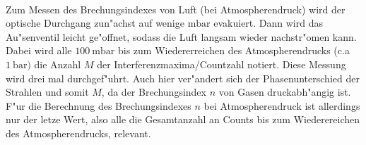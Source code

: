   \\Zum Messen des Brechungsindexes von Luft (bei Atmospherendruck) wird der optische Durchgang zun"achst auf wenige $\si{\milli \bar}$ evakuiert.
  Dann wird das Au"senventil leicht ge"offnet, sodass die Luft langsam wieder nachstr"omen kann. Dabei wird alle $\SI{100}{\milli \bar}$ bis zum Wiedererreichen des Atmospherendrucks (c.a $\SI{1}{\bar})$ die Anzahl $M$ der Interferenzmaxima/Countzahl notiert.
  Diese Messung wird drei mal durchgef"uhrt.
  Auch hier ver"andert sich der Phasenunterschied der Strahlen und somit $M$, da der Brechungsindex $n$ von Gasen druckabh"angig ist.
  F"ur die Berechnung des Brechungsindexes $n$ bei Atmospherendruck ist allerdings nur der letze Wert, also alle die Gesamtanzahl an Counts bis zum Wiederereichen des Atmospherendrucks, relevant.

